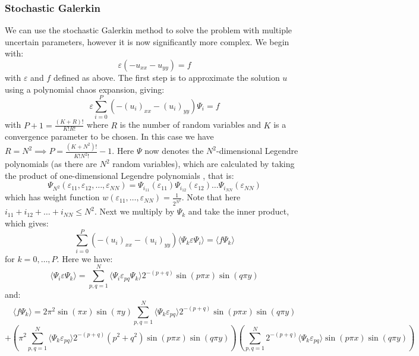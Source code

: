 \documentclass[11pt]{article}
\numberwithin{equation}{section}
\begin{document}
\subsubsection{Stochastic Galerkin}
We can use the stochastic Galerkin method to solve the problem with multiple uncertain parameters, however it is now significantly more complex. We begin with:
\begin{equation}
\varepsilon(-u_{xx} - u_{yy}) = f
\end{equation}
with $\varepsilon$ and $f$ defined as above. The first step is to approximate the solution $u$ using a polynomial chaos expansion, giving:
\begin{equation}
\varepsilon \sum_{i=0}^P (-(u_i)_{xx} - (u_i)_{yy}) \Psi_i = f
\end{equation}
with $P+1 = \frac{(K+R)!}{K!R!}$ where $R$ is the number of random variables and $K$ is a convergence parameter to be chosen. In this case we have $R = N^2 \implies P=\frac{(K+N^2)!}{K!N^2!} - 1$. Here $\Psi$ now denotes the $N^2$-dimensional Legendre polynomials (as there are $N^2$ random variables), which are calculated by taking the product of one-dimensional Legendre polynomials \cite{Paul}, that is:
\begin{equation}
\Psi_{N^2} (\varepsilon_{11}, \varepsilon_{12}, \dots, \varepsilon_{NN}) = \Psi_{i_{11}} (\varepsilon_{11})  \Psi_{i_{12}} (\varepsilon_{12}) \dots \Psi_{i_{NN}} (\varepsilon_{NN})  
\end{equation}
which has weight function $w(\varepsilon_{11}, \dots, \varepsilon_{NN}) = \frac{1}{2^{N^2}}$. Note that here $i_{11} + i_{12} + \dots + i_{NN} \leq N^2$. Next we multiply by $\Psi_k$ and take the inner product, which gives:
\begin{equation}
\sum_{i=0}^P (-(u_i)_{xx} - (u_i)_{yy}) \langle \Psi_k \varepsilon \Psi_i \rangle = \langle f \Psi_k \rangle
\end{equation}
for $k=0,\dots,P$. Here we have:
\begin{equation}
\langle \Psi_i \varepsilon \Psi_k \rangle = \sum_{p,q=1}^N \langle \Psi_i \varepsilon_{pq} \Psi_k \rangle 2^{-(p+q)} \sin(p\pi x)\sin(q\pi y) 
\end{equation}
and:
\begin{equation}
\langle f \Psi_k \rangle = 2 \pi^2 \sin(\pi x)\sin(\pi y) \sum_{p,q=1}^N \langle \Psi_k \varepsilon_{pq} \rangle 2^{-(p+q)} \sin(p \pi x) \sin(q \pi y)  \nonumber
\end{equation}
\begin{equation}
+ \left(\pi^2 \sum_{p,q=1}^N \langle \Psi_k \varepsilon_{pq} \rangle 2^{-(p+q)} (p^2 + q^2) \sin(p \pi x)\sin(q \pi y) \right) \left(\sum_{p,q=1}^N 2^{-(p+q)} \langle \Psi_k \varepsilon_{pq} \rangle \sin(p \pi x)\sin(q \pi y) \right)
\end{equation}
\end{document}
